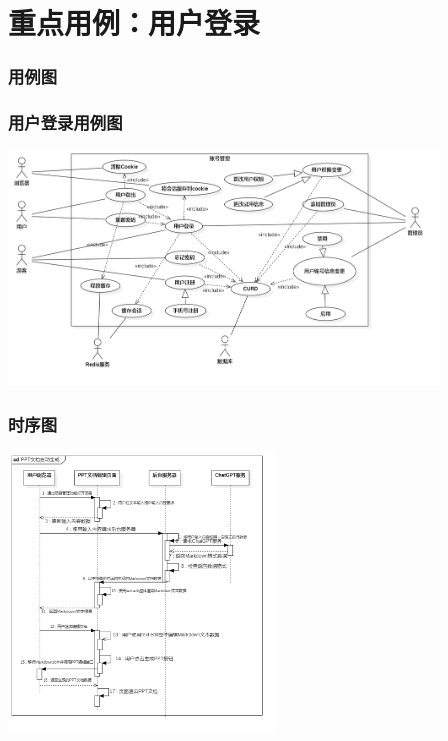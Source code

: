 \section{重点用例：用户登录}
\begin{frame}
    \frametitle{用例图}
    \frametitle{用户登录用例图}
    \center
    \includegraphics[width=4.5in]{contents/figure/login_usecase_diagram.png}
\end{frame}
\begin{frame}
    \frametitle{时序图}
    \center
    \includegraphics[width=2.8in]{contents/figure/PPT_creator_sequence_diagram.png}
\end{frame}